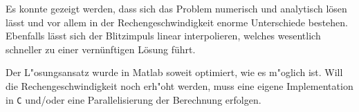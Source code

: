 \begin{refsection}
Es konnte gezeigt werden, dass sich das Problem numerisch und analytisch lösen lässt und vor allem in der Rechengeschwindigkeit enorme Unterschiede bestehen. Ebenfalls lässt sich der Blitzimpuls linear interpolieren, welches wesentlich schneller zu einer vernünftigen Lösung führt.

Der L"osungsansatz wurde in Matlab soweit optimiert, wie es m"oglich ist. Will die Rechengeschwindigkeit noch erh"oht werden, muss eine eigene Implementation in \texttt{C} und/oder eine Parallelisierung der Berechnung erfolgen.

\printbibliography[heading=subbibliography]
\end{refsection}
